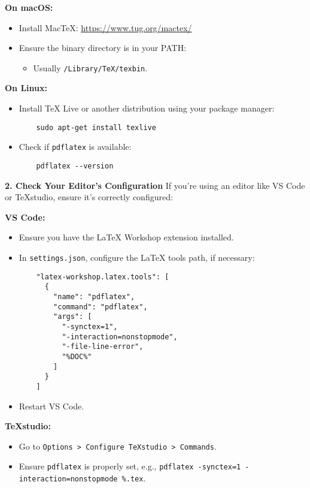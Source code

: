 \begin{enumerate}
\textbf{On macOS:}
\begin{itemize}
    \item Install MacTeX: \url{https://www.tug.org/mactex/}
    \item Ensure the binary directory is in your PATH:
    \begin{itemize}
        \item Usually \texttt{/Library/TeX/texbin}.
    \end{itemize}
\end{itemize}

\textbf{On Linux:}
\begin{itemize}
    \item Install TeX Live or another distribution using your package manager:
    \begin{verbatim}
    sudo apt-get install texlive
    \end{verbatim}
    \item Check if \texttt{pdflatex} is available:
    \begin{verbatim}
    pdflatex --version
    \end{verbatim}
\end{itemize}

\textbf{2. Check Your Editor's Configuration}
If you're using an editor like VS Code or TeXstudio, ensure it's correctly configured:

\textbf{VS Code:}
\begin{itemize}
    \item Ensure you have the LaTeX Workshop extension installed.
    \item In \texttt{settings.json}, configure the LaTeX tools path, if necessary:
    \begin{verbatim}
    "latex-workshop.latex.tools": [
      {
        "name": "pdflatex",
        "command": "pdflatex",
        "args": [
          "-synctex=1",
          "-interaction=nonstopmode",
          "-file-line-error",
          "%DOC%"
        ]
      }
    ]
    \end{verbatim}
    \item Restart VS Code.
\end{itemize}

\textbf{TeXstudio:}
\begin{itemize}
    \item Go to \texttt{Options > Configure TeXstudio > Commands}.
    \item Ensure \texttt{pdflatex} is properly set, e.g., \texttt{pdflatex -synctex=1 -interaction=nonstopmode \%.tex}.
\end{itemize}


\end{enumerate}
